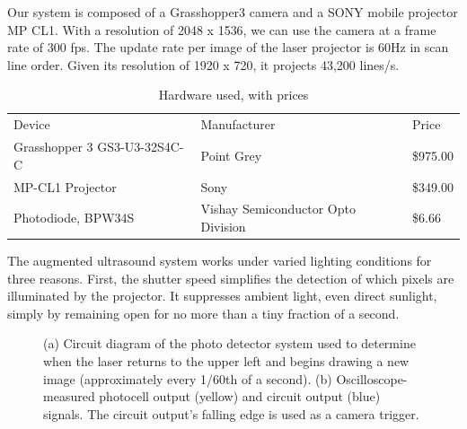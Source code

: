 \documentclass{llncs}
\begin{document}
Our system is composed of a Grasshopper3 camera and a SONY mobile projector MP CL1. With a resolution of 2048 x 1536, we can use the camera at a frame rate of 300 fps. The update rate per image of the laser projector is 60Hz in scan line order. Given its resolution of 1920 x 720, it projects 43,200 lines/s.
\begin{table}
\caption{Hardware used, with prices}
\begin{tabular}{lll}
\hline\noalign{\smallskip}
Device & Manufacturer & Price \\ \noalign{\smallskip}\hline\noalign{\smallskip} 
Grasshopper 3 GS3-U3-32S4C-C & Point Grey &  \$975.00\\ 
MP-CL1 Projector & Sony & \$349.00 \\ 
Photodiode, BPW34S & Vishay Semiconductor Opto Division & \$6.66 \\ \hline
\end{tabular}
\end{table}

The augmented ultrasound system works under varied lighting conditions for three reasons. First, the shutter speed simplifies the detection of which pixels are illuminated by the projector. It suppresses ambient light, even direct sunlight, simply by remaining open for no more than a tiny fraction of a second.

\begin{figure}[h]
\centering
{}\hfill%
\caption{
(a) Circuit diagram of the photo detector system used to determine when the laser returns to the upper left and begins drawing a new image (approximately every 1/60th of a second). (b) Oscilloscope-measured photocell output (yellow) and circuit output (blue) signals.  The circuit output's falling edge is used as a camera trigger.
}
\end{figure}
\end{document}
